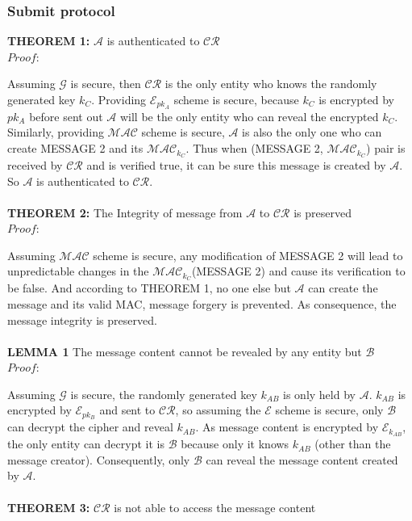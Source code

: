 \documentclass[10pt,a4paper]{article}
\begin{document}
\subsubsection*{Submit protocol}
\textbf{THEOREM 1:} $\mathcal{A}$ is authenticated to $\mathcal{CR}$ \\
\emph{$Proof:$} \par
Assuming $\mathcal{G}$ is secure, then $\mathcal{CR}$ is the only entity who knows the randomly generated key $k_C$. Providing $\mathcal{E}_{pk_A}$ scheme is secure, because $k_C$ is encrypted by $pk_A$ before sent out $\mathcal{A}$ will be the only entity who can reveal the encrypted $k_C$. Similarly, providing $\mathcal{MAC}$ scheme is secure, $\mathcal{A}$ is also the only one who can create MESSAGE 2 and its $\mathcal{MAC}_{k_C}$. Thus when (MESSAGE 2, $\mathcal{MAC}_{k_C}$) pair is received by $\mathcal{CR}$ and is verified true, it can be sure this message is created by $\mathcal{A}$. So $\mathcal{A}$ is authenticated to $\mathcal{CR}$.
\\
\\
\textbf{THEOREM 2:} The Integrity of message from $\mathcal{A}$ to $\mathcal{CR}$ is preserved \\
\emph{$Proof:$} \par
Assuming $\mathcal{MAC}$ scheme is secure, any modification of MESSAGE 2 will lead to unpredictable changes in the $\mathcal{MAC}_{k_C}$(MESSAGE 2) and cause its verification to be false. And according to THEOREM 1, no one else but $\mathcal{A}$ can create the message and its valid MAC, message forgery is prevented. As consequence, the message integrity is preserved.
\\
\\
\textbf{LEMMA 1} The message content cannot be revealed by any entity but $\mathcal{B}$ \\
\emph{$Proof:$} \par
Assuming $\mathcal{G}$ is secure, the randomly generated key $k_{AB}$ is only held by $\mathcal{A}$. $k_{AB}$ is encrypted by $\mathcal{E}_{pk_B}$ and sent to $\mathcal{CR}$, so assuming the $\mathcal{E}$ scheme is secure, only $\mathcal{B}$ can decrypt the cipher and reveal $k_{AB}$. As message content is encrypted by $\mathcal{E}_{k_{AB}}$, the only entity can decrypt it is $\mathcal{B}$ because only it knows $k_{AB}$ (other than the message creator). Consequently, only $\mathcal{B}$ can reveal the message content created by $\mathcal{A}$.
\\
\\
\textbf{THEOREM 3:} $\mathcal{CR}$ is not able to access the message content
\end{document}
